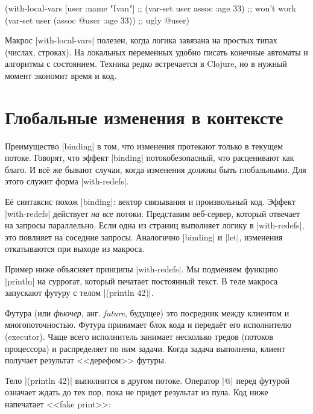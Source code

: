 \begin{english}
  \begin{clojure}
(with-local-vars [user {:name "Ivan"}]
  ;; (var-set user assoc :age 33) ;; won't work
  (var-set user (assoc @user :age 33)) ;; ugly
  @user)
  \end{clojure}
\end{english}

Макрос \spverb|with-local-vars| полезен, когда логика завязана на простых типах
(числах, строках). На локальных переменных удобно писать конечные автоматы и
алгоритмы с состоянием. Техника редко встречается в Clojure, но в нужный момент
экономит время и код.

\section{Глобальные изменения в контексте}


\label{with-redefs}

Преимущество \spverb|binding| в том, что изменения протекают только в текущем
потоке. Говорят, что эффект \spverb|binding| потокобезопасный, что расценивают
как благо. И вс\"{е} же бывают случаи, когда изменения должны быть глобальными. Для
этого служит форма \spverb|with-redefs|.

Е\"{е} синтаксис похож \spverb|binding|: вектор связывания и произвольный
код. Эффект \spverb|with-redefs| действует \emph{на все} потоки. Представим
веб-сервер, который отвечает на запросы параллельно. Если одна из страниц
выполняет логику в \spverb|with-redefs|, это повлияет на соседние
запросы. Аналогично \spverb|binding| и \spverb|let|, изменения откатываются при
выходе из макроса.

Пример ниже объясняет принципы \spverb|with-redefs|. Мы подменяем функцию
\spverb|println| на суррогат, который печатает постоянный текст. В теле макроса
запускают футуру с телом \spverb|(println 42)|.


Футура (или \emph{фьючер}, анг. \emph{future}, будущее) это посредник между
клиентом и многопоточностью. Футура принимает блок кода и передаёт его
исполнителю (executor). Чаще всего исполнитель занимает несколько тредов
(потоков процессора) и распределяет по ним задачи. Когда задача выполнена,
клиент получает результат <<дерефом>> футуры.

Тело \spverb|(println 42)| выполнится в другом потоке. Оператор \spverb|@|
перед футурой означает ждать до тех пор, пока не придет результат из пула. Код
ниже напечатает <<fake print>>:

